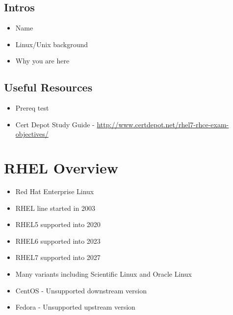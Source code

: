\documentclass[letterpaper,10pt,english]{sphinxmanual}
\begin{document}
\subsection{Intros}
\label{intro:intros}\begin{itemize}
\item {} 
Name

\item {} 
Linux/Unix background

\item {} 
Why you are here

\end{itemize}


\subsection{Useful Resources}
\label{intro:useful-resources}\begin{itemize}
\item {} 
Prereq test

\item {} 
Cert Depot Study Guide - \href{http://www.certdepot.net/rhel7-rhce-exam-objectives/}{http://www.certdepot.net/rhel7-rhce-exam-objectives/}

\end{itemize}


\section{RHEL Overview}
\label{intro:rhel-overview}\begin{itemize}
\item {} 
Red Hat Enterprise Linux

\item {} 
RHEL line started in 2003

\item {} 
RHEL5 supported into 2020

\item {} 
RHEL6 supported into 2023

\item {} 
RHEL7 supported into 2027

\item {} 
Many variants including Scientific Linux and Oracle Linux

\item {} 
CentOS - Unsupported downstream version

\item {} 
Fedora - Unsupported upstream version

\end{itemize}
\end{document}
